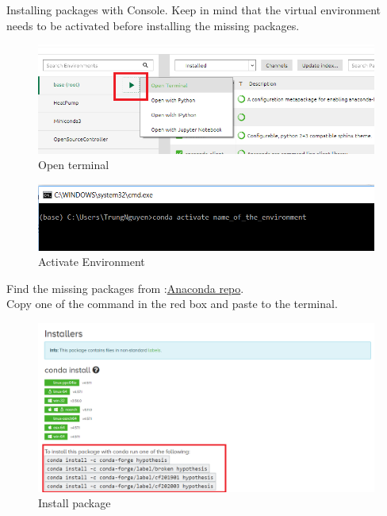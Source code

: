 \documentclass[a4paper,10pt]{article}
\begin{document}
\newpage

Installing packages with Console. Keep in mind that the virtual environment needs to be activated before installing the missing packages.

\begin{figure}[H]
\centering\includegraphics[width=1\columnwidth]{Pictures/Open_terminal.png}
\caption[Short title]{Open terminal}
\label{fig:ff4}\end{figure}

\begin{figure}[H]
\centering\includegraphics[width=1\columnwidth]{Pictures/activate_env.png}
\caption[Short title]{Activate Environment}
\label{fig:ff5}\end{figure}

Find the missing packages from :\href{https://anaconda.org/conda-forge/repo}{Anaconda repo}.\\ 
Copy one of the command in the red box and paste to the terminal.

\begin{figure}[H]
\centering\includegraphics[width=1\columnwidth]{Pictures/install_pack.png}
\caption[Short title]{Install package}
\label{fig:ff6}\end{figure}
\end{document}
